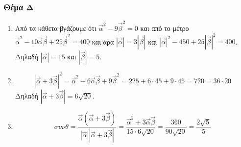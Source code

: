 \documentclass[12pt]{article}
\begin{document}
\section*{Θέμα Δ}
  \noindent
  \begin{enumerate}
    \item Από τα κάθετα βγάζουμε ότι $\vec{α}^2-9\vec{β}^2=0$ και από το μέτρο $\vec{α}^2-10\vec{α}\vec{β}+25\vec{β}^2=400$ και άρα $|\vec{α}|=3|\vec{β}|$ και $|\vec{α}|^2-450+25|\vec{β}|^2=400$. Δηλαδή $|\vec{α}|=15$ και $|\vec{β}|=5$.
    \item $$|\vec{α}+3\vec{β}|^2=\vec{α}^2+6\vec{α}\vec{β}+9\vec{β}^2=225+6\cdot 45+9\cdot 45=720=36\cdot 20$$ Δηλαδή $|\vec{α}+3\vec{β}|=6\sqrt{20}$.
    \item $$συνθ=\frac{\vec{α}(\vec{α}+3\vec{β})}{|\vec{α}||\vec{α}+3\vec{β}|}=\frac{\vec{α}^2+3\vec{α}\vec{β}}{15\cdot 6\sqrt{20}}=\frac{360}{90\sqrt{20}}=\frac{2\sqrt{5}}{5}$$
  \end{enumerate}

\vspace{3\baselineskip}

\part*{}
\end{document}
